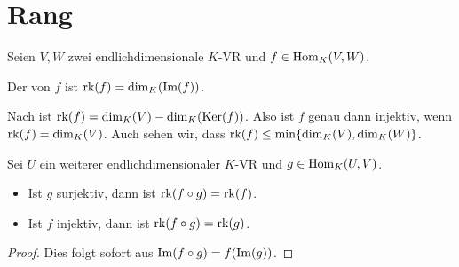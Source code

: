 \section{Rang}

Seien $V,W$ zwei endlichdimensionale $K$-VR und $f\in \operatorname{Hom}_K(V,W)$.

\begin{definition}[Rang]
	Der  von $f$ ist $\operatorname{rk}(f)=\dim_K(\operatorname{Im}(f))$.
\end{definition}

\begin{remark}
	Nach  ist $\operatorname{rk}(f)=\dim_K(V)-\dim_K(\operatorname{Ker}(f))$. Also ist $f$ genau dann injektiv, wenn $\operatorname{rk}(f)=\dim_K(V)$. Auch sehen wir, 
	dass $\operatorname{rk}(f)\le \min\{\dim_K(V),\dim_K(W)\}$.
\end{remark}

\begin{lemma}
	Sei $U$ ein weiterer endlichdimensionaler $K$-VR und $g\in \operatorname{Hom}_K(U,V)$.
	\begin{itemize}
		\item Ist $g$ surjektiv, dann ist $\operatorname{rk}(f\circ g)=\operatorname{rk}(f)$.
		\item Ist $f$ injektiv, dann ist $\operatorname{rk}(f\circ g)=\operatorname{rk}(g)$.
	\end{itemize}
\end{lemma}
\begin{proof}
	Dies folgt sofort aus $\operatorname{Im}(f\circ g)=f(\operatorname{Im}(g))$.
\end{proof}


